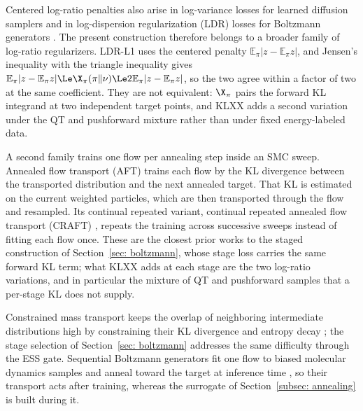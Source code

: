 \documentclass{article}
\begin{document}
Centered log-ratio penalties also arise in log-variance losses for learned diffusion samplers \citep{richter2024improved} and in log-dispersion regularization (LDR) losses for Boltzmann generators \citep{schopmans2026ldr}. The present construction therefore belongs to a broader family of log-ratio regularizers. LDR-L1 uses the centered penalty $\mathbb E_\pi|z-\mathbb E_\pi z|$, and Jensen's inequality with the triangle inequality gives $\mathbb E_\pi|z-\mathbb E_\pi z|\Le\X_\pi(\pi\|\nu)\Le2\mathbb E_\pi|z-\mathbb E_\pi z|$, so the two agree within a factor of two at the same coefficient. They are not equivalent: $\X_\pi$ pairs the forward KL integrand at two independent target points, and KLXX adds a second variation under the QT and pushforward mixture rather than under fixed energy-labeled data.

A second family trains one flow per annealing step inside an SMC sweep. Annealed flow transport (AFT) \citep{arbel2021annealed} trains each flow by the KL divergence between the transported distribution and the next annealed target. That KL is estimated on the current weighted particles, which are then transported through the flow and resampled. Its continual repeated variant, continual repeated annealed flow transport (CRAFT) \citep{matthews2022craft}, repeats the training across successive sweeps instead of fitting each flow once. These are the closest prior works to the staged construction of Section~\ref{sec: boltzmann}, whose stage loss carries the same forward KL term; what KLXX adds at each stage are the two log-ratio variations, and in particular the mixture of QT and pushforward samples that a per-stage KL does not supply.

Constrained mass transport keeps the overlap of neighboring intermediate distributions high by constraining their KL divergence and entropy decay \citep{vonklitzing2026constrained}; the stage selection of Section~\ref{sec: boltzmann} addresses the same difficulty through the ESS gate. Sequential Boltzmann generators fit one flow to biased molecular dynamics samples and anneal toward the target at inference time \citep{tan2025sequential}, so their transport acts after training, whereas the surrogate of Section~\ref{subsec: annealing} is built during it.
\end{document}

